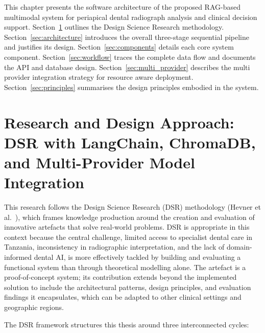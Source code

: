 \documentclass[12pt,a4paper]{report}
\begin{document}
	This chapter presents the software architecture of the proposed RAG-based multimodal system
	for periapical dental radiograph analysis and clinical decision support.
	Section~\ref{sec:dsr} outlines the Design Science Research methodology.
	Section~\ref{sec:architecture} introduces the overall three-stage sequential pipeline and
	justifies its design. Section~\ref{sec:components} details each core system component.
	Section~\ref{sec:workflow} traces the complete data flow and documents the API and database
	design. Section~\ref{sec:multi_provider} describes the multi provider integration strategy
	for resource aware deployment. Section~\ref{sec:principles} summarises the design
	principles embodied in the system.
	
	\section{Research and Design Approach: DSR with LangChain, ChromaDB, and Multi-Provider Model Integration} 
	\label{sec:dsr}
	
	This research follows the Design Science Research (DSR) methodology
	(Hevner et al.~\cite{Hevner2004}), which frames knowledge production around the
	creation and evaluation of innovative artefacts that solve real-world problems.
	DSR is appropriate in this context because the central challenge, limited
	access to specialist dental care in Tanzania, inconsistency in radiographic
	interpretation, and the lack of domain-informed dental AI, is more effectively
	tackled by building and evaluating a functional system than through theoretical
	modelling alone. The artefact is a proof-of-concept system; its contribution
	extends beyond the implemented solution to include the architectural patterns,
	design principles, and evaluation findings it encapsulates, which can be adapted
	to other clinical settings and geographic regions.
	
	The DSR framework structures this thesis around three interconnected cycles:
	
\end{document}
